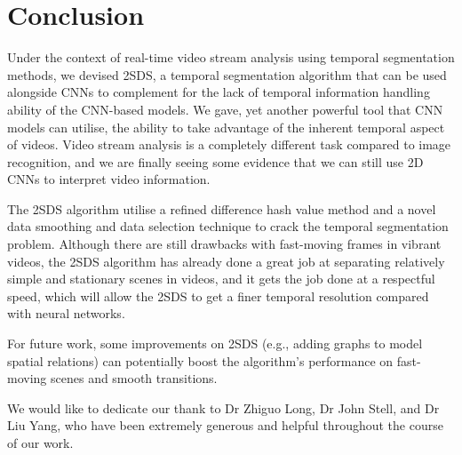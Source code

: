 \documentclass[
twocolumn,
]{ceurart}
\begin{document}
\section{Conclusion}
Under the context of real-time video stream analysis using temporal segmentation methods, we devised 2SDS, a temporal segmentation algorithm that can be used alongside CNNs to complement for the lack of temporal information handling ability of the CNN-based models. We gave, yet another powerful tool that CNN models can utilise, the ability to take advantage of the inherent temporal aspect of videos. Video stream analysis is a completely different task compared to image recognition, and we are finally seeing some evidence that we can still use 2D CNNs to interpret video information.

The 2SDS algorithm utilise a refined difference hash value method and a novel data smoothing and data selection technique to crack the temporal segmentation problem. Although there are still drawbacks with fast-moving frames in vibrant videos, the 2SDS algorithm has already done a great job at separating relatively simple and stationary scenes in videos, and it gets the job done at a respectful speed, which will allow the 2SDS to get a finer temporal resolution compared with neural networks.

For future work, some improvements on 2SDS (e.g., adding graphs to model spatial relations) can potentially boost the algorithm’s performance on fast-moving scenes and smooth transitions.


\begin{acknowledgments}
  We would like to dedicate our thank to Dr Zhiguo Long, Dr John Stell, and Dr Liu Yang, who have been extremely generous and helpful throughout the course of our work.  
\end{acknowledgments}


\end{document}
